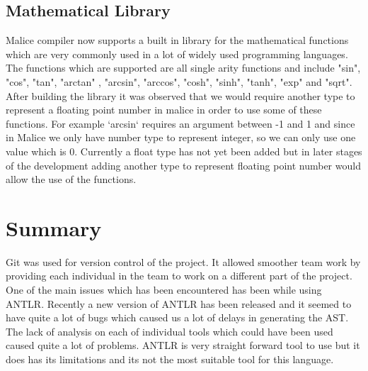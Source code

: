\documentclass[a4wide, 11pt]{article}
\begin{document}
	\subsection{Mathematical Library}
		Malice compiler now supports a built in library for the mathematical functions which are very commonly used in a lot of widely
		used programming languages. The functions which are supported are all single arity functions and include "sin", "cos", "tan", "arctan"
		, "arcsin", "arccos", "cosh", "sinh", "tanh", "exp" and "sqrt". After building the library it was observed that we would require 
		another type to represent a floating point number in malice in order to use some of these functions. For example `arcsin` requires an
		argument between -1 and 1 and since in Malice we only have number type to represent integer, so we can only use one value which is
		0. Currently a float type has not yet been added but in later stages of the development adding another type to represent floating
		point number would allow the use of the functions.
		
		
\section{Summary}
	Git was used for version control of the project. It allowed smoother team work by providing each individual in the team to work
	on a different part of the project. One of the main issues which has been encountered has been while using ANTLR. Recently a new
	version of ANTLR has been released and it seemed to have quite a lot of bugs which caused us a lot of delays in generating the AST.
	The lack of analysis on each of individual tools which could have been used caused quite a lot of problems. ANTLR is very straight
	forward tool to use but it does has its limitations and its not the most suitable tool for this language.
\end{document}

